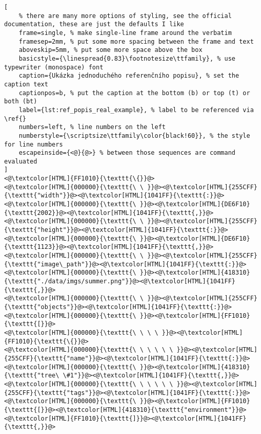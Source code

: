 \clearpage
\begin{lstlisting}[
	% there are many more options of styling, see the official documentation, these are just the defaults I like
	frame=single, % make single-line frame around the verbatim
	framesep=2mm, % put some more spacing between the frame and text
	aboveskip=5mm, % put some more space above the box
	basicstyle={\linespread{0.83}\footnotesize\ttfamily}, % use typewriter (monospace) font
	caption={Ukázka jednoduchého referenčního popisu}, % set the caption text
	captionpos=b, % put the caption at the bottom (b) or top (t) or both (bt)
	label={lst:ref_popis_real_example}, % label to be referenced via \ref{}
	numbers=left, % line numbers on the left
	numberstyle={\scriptsize\ttfamily\color{black!60}}, % the style for line numbers
	escapeinside={<@}{@>} % between those sequences are command evaluated
]
<@\textcolor[HTML]{FF1010}{\texttt{\{}}@>
<@\textcolor[HTML]{000000}{\texttt{\ \ }}@><@\textcolor[HTML]{255CFF}{\texttt{"width"}}@><@\textcolor[HTML]{1041FF}{\texttt{:}}@><@\textcolor[HTML]{000000}{\texttt{\ }}@><@\textcolor[HTML]{DE6F10}{\texttt{2002}}@><@\textcolor[HTML]{1041FF}{\texttt{,}}@>
<@\textcolor[HTML]{000000}{\texttt{\ \ }}@><@\textcolor[HTML]{255CFF}{\texttt{"height"}}@><@\textcolor[HTML]{1041FF}{\texttt{:}}@><@\textcolor[HTML]{000000}{\texttt{\ }}@><@\textcolor[HTML]{DE6F10}{\texttt{1123}}@><@\textcolor[HTML]{1041FF}{\texttt{,}}@>
<@\textcolor[HTML]{000000}{\texttt{\ \ }}@><@\textcolor[HTML]{255CFF}{\texttt{"image\_path"}}@><@\textcolor[HTML]{1041FF}{\texttt{:}}@><@\textcolor[HTML]{000000}{\texttt{\ }}@><@\textcolor[HTML]{418310}{\texttt{"./data/imgs/summer.png"}}@><@\textcolor[HTML]{1041FF}{\texttt{,}}@>
<@\textcolor[HTML]{000000}{\texttt{\ \ }}@><@\textcolor[HTML]{255CFF}{\texttt{"objects"}}@><@\textcolor[HTML]{1041FF}{\texttt{:}}@><@\textcolor[HTML]{000000}{\texttt{\ }}@><@\textcolor[HTML]{FF1010}{\texttt{[}}@>
<@\textcolor[HTML]{000000}{\texttt{\ \ \ \ }}@><@\textcolor[HTML]{FF1010}{\texttt{\{}}@>
<@\textcolor[HTML]{000000}{\texttt{\ \ \ \ \ \ }}@><@\textcolor[HTML]{255CFF}{\texttt{"name"}}@><@\textcolor[HTML]{1041FF}{\texttt{:}}@><@\textcolor[HTML]{000000}{\texttt{\ }}@><@\textcolor[HTML]{418310}{\texttt{"tree\ \#1"}}@><@\textcolor[HTML]{1041FF}{\texttt{,}}@>
<@\textcolor[HTML]{000000}{\texttt{\ \ \ \ \ \ }}@><@\textcolor[HTML]{255CFF}{\texttt{"tags"}}@><@\textcolor[HTML]{1041FF}{\texttt{:}}@><@\textcolor[HTML]{000000}{\texttt{\ }}@><@\textcolor[HTML]{FF1010}{\texttt{[}}@><@\textcolor[HTML]{418310}{\texttt{"environment"}}@><@\textcolor[HTML]{FF1010}{\texttt{]}}@><@\textcolor[HTML]{1041FF}{\texttt{,}}@>

\end{lstlisting}

